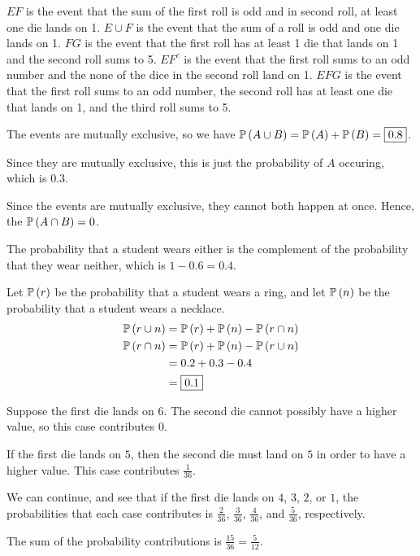\documentclass{article}
\begin{document}
\setcounter{problem}{2} 
\problem{}

$EF$ is the event that the sum of the first roll is odd and in second roll, at least one die lands on 1.
$E \cup F$ is the event that the sum of a roll is odd and one die lands on 1.
$FG$ is the event that the first roll has at least 1 die that lands on 1 and the second roll sums to 5.
$EF^c$ is the event that the first roll sums to an odd number and the none of the dice in the second roll land on 1.
$EFG$ is the event that the first roll sums to an odd number, the second roll has at least one die that lands on 1, and the third roll sums to 5.

\setcounter{problem}{8}

\subproblema{}
The events are mutually exclusive, so we have $\mathbb{P} \left ( A \cup B \right) = \mathbb{P} \left ( A \right) + \mathbb{P} \left ( B \right) = \boxed{0.8}$.

\subproblema{}
Since they are mutually exclusive, this is just the probability of $A$ occuring, which is $\boxed{0.3}$.

\subproblema{}
Since the events are mutually exclusive, they cannot both happen at once.
Hence, the $\mathbb{P} \left ( A \cap B \right) = 0$.


\setcounter{problem}{10}
\subproblema{}
The probability that a student wears either is the complement of the probability that they wear neither, which is $1 - 0.6 = \boxed{0.4}$.


\subproblema{}

Let $\mathbb{P} \left ( r \right)$ be the probability that a student wears a ring, and let $\mathbb{P} \left ( n \right)$ be the probability that a student wears a necklace.
\begin{align*}
  \mathbb{P} \left ( r \cup n \right) &= \mathbb{P} \left ( r \right) + \mathbb{P} \left ( n \right) - \mathbb{P} \left ( r \cap n \right) \\
  \mathbb{P} \left ( r \cap n \right) &= \mathbb{P} \left ( r \right) + \mathbb{P} \left ( n \right) - \mathbb{P} \left ( r \cup n \right) \\
                      &= 0.2 + 0.3 - 0.4 \\
                      &= \boxed{0.1} \\
\end{align*}

\setcounter{problem}{22}
\problem{}

Suppose the first die lands on $6$.
The second die cannot possibly have a higher value, so this case contributes $0$.

If the first die lands on $5$, then the second die must land on $5$ in order to have a higher value.
This case contributes $\frac{1}{36}$.

We can continue, and see that if the first die lands on $4$, $3$, $2$, or $1$, the probabilities that each case contributes is $\frac{2}{36}$, $\frac{3}{36}$, $\frac{4}{36}$, and $\frac{5}{36}$, respectively.

The sum of the probability contributions is $\frac{15}{36} = \boxed{\frac{5}{12}}$.
\end{document}
